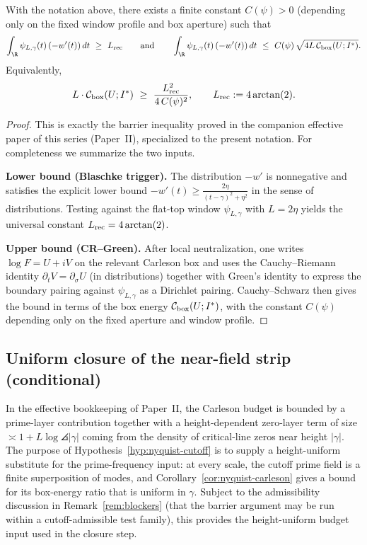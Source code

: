\documentclass[11pt]{article}
\begin{document}
\begin{proposition}\label{prop:barrier-ineq}
With the notation above, there exists a finite constant $C(\psi)>0$ (depending only on the fixed window profile and box aperture) such that
\begin{equation}\label{eq:barrier-ineq}
  \int_{\R}\psi_{L,\gamma}(t)\,(-w'(t))\,dt\ \ge\ L_{\rm rec}
  \qquad\text{and}\qquad
  \int_{\R}\psi_{L,\gamma}(t)\,(-w'(t))\,dt\ \le\ C(\psi)\,\sqrt{4L\,\mathcal C_{\rm box}(U;I^\ast)}.
\end{equation}
Equivalently,
\[
  L\cdot \mathcal C_{\rm box}(U;I^\ast)\ \ge\ \frac{L_{\rm rec}^2}{4\,C(\psi)^2},
  \qquad
  L_{\rm rec}:=4\arctan(2).
\]
\end{proposition}
\begin{proof}
This is exactly the barrier inequality proved in the companion effective paper of this series (Paper~II), specialized to the present notation.
For completeness we summarize the two inputs.

\smallskip\noindent
\textbf{Lower bound (Blaschke trigger).}
The distribution $-w'$ is nonnegative and satisfies the explicit lower bound
$-w'(t)\ge \frac{2\eta}{(t-\gamma)^2+\eta^2}$ in the sense of distributions.
Testing against the flat-top window $\psi_{L,\gamma}$ with $L=2\eta$ yields the universal constant
$L_{\rm rec}=4\arctan(2)$.

\smallskip\noindent
\textbf{Upper bound (CR--Green).}
After local neutralization, one writes $\log F=U+iV$ on the relevant Carleson box and uses the Cauchy--Riemann identity $\partial_t V=\partial_\sigma U$ (in distributions) together with Green's identity to express the boundary pairing against $\psi_{L,\gamma}$ as a Dirichlet pairing.
Cauchy--Schwarz then gives the bound in terms of the box energy $\mathcal C_{\rm box}(U;I^\ast)$, with the constant $C(\psi)$ depending only on the fixed aperture and window profile.
\end{proof}

\subsection*{Uniform closure of the near-field strip (conditional)}
In the effective bookkeeping of Paper~II, the Carleson budget is bounded by a prime-layer contribution together with a height-dependent zero-layer term of size $\asymp 1+L\log\angles{|\gamma|}$ coming from the density of critical-line zeros near height $|\gamma|$.
The purpose of Hypothesis~\ref{hyp:nyquist-cutoff} is to supply a height-uniform substitute for the prime-frequency input: at every scale, the cutoff prime field is a finite superposition of modes, and Corollary~\ref{cor:nyquist-carleson} gives a bound for its box-energy ratio that is uniform in $\gamma$.
Subject to the admissibility discussion in Remark~\ref{rem:blockers} (that the barrier argument may be run within a cutoff-admissible test family), this provides the height-uniform budget input used in the closure step.
\end{document}

